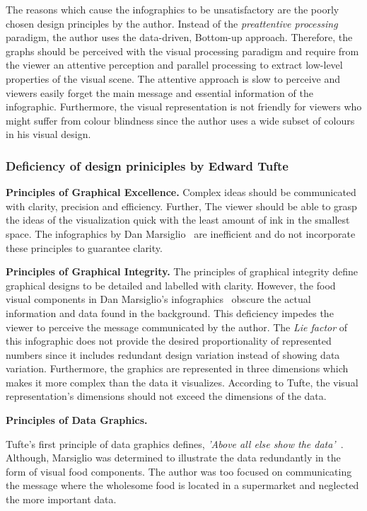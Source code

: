 The reasons which cause the infographics to be unsatisfactory are the poorly
chosen design principles by the author. Instead of the \textit{preattentive
processing} paradigm, the author uses the data-driven, Bottom-up approach.
Therefore, the graphs should be perceived with the visual processing paradigm
and require from the viewer an attentive perception and parallel processing to
extract low-level properties of the visual scene. The attentive approach is slow
to perceive and viewers easily forget the main message and essential information
of the infographic. Furthermore, the visual representation is not friendly for
viewers who might suffer from colour blindness since the author uses a wide
subset of colours in his visual design.

\subsubsection{Deficiency of design priniciples by Edward Tufte}

\textbf{Principles of Graphical Excellence.} Complex ideas should be
communicated with clarity, precision and efficiency. Further, The viewer should
be able to grasp the ideas of the visualization quick with the least amount of
ink in the smallest space. The infographics by Dan
Marsiglio~\cite{DanMarsiglio2008} are inefficient and do not incorporate these
principles to guarantee clarity.

\textbf{Principles of Graphical Integrity.} The principles of graphical
integrity define graphical designs to be detailed and labelled with clarity.
However, the food visual components in Dan Marsiglio's
infographics~\cite{DanMarsiglio2008} obscure the actual information and data
found in the background. This deficiency impedes the viewer to perceive the
message communicated by the author. The \textit{Lie factor} of this infographic
does not provide the desired proportionality of represented numbers since it
includes redundant design variation instead of showing data variation.
Furthermore, the graphics are represented in three dimensions which makes it
more complex than the data it visualizes. According to Tufte, the visual
representation's dimensions should not exceed the dimensions of the data. 

\textbf{Principles of Data Graphics.}

Tufte's first principle of data graphics defines, \textit{'Above all else show
the data'}~\cite{Tufte2001}. Although, Marsiglio was determined to illustrate the
data redundantly in the form of visual food components. The author was too
focused on communicating the message where the wholesome food is located in a
supermarket and neglected the more important data.

